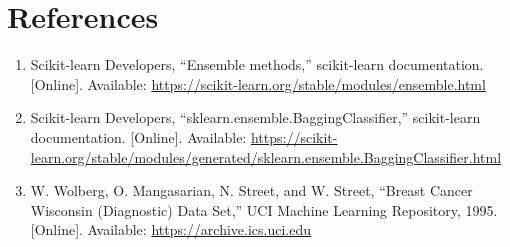 \documentclass[12pt,a4paper]{article}
\begin{document}
\section{References}
\begin{enumerate}[label=[\arabic*]]
\item Scikit-learn Developers, ``Ensemble methods,'' scikit-learn documentation. [Online]. Available: \url{https://scikit-learn.org/stable/modules/ensemble.html}
\item Scikit-learn Developers, ``sklearn.ensemble.BaggingClassifier,'' scikit-learn documentation. [Online]. Available: \url{https://scikit-learn.org/stable/modules/generated/sklearn.ensemble.BaggingClassifier.html}
\item W. Wolberg, O. Mangasarian, N. Street, and W. Street, ``Breast Cancer Wisconsin (Diagnostic) Data Set,'' UCI Machine Learning Repository, 1995. [Online]. Available: \url{https://archive.ics.uci.edu}
\end{enumerate}
\end{document}
